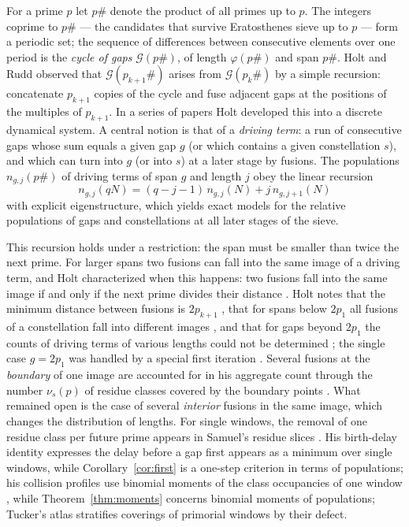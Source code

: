 \documentclass[11pt]{article}
\theoremstyle{definition}
\theoremstyle{remark}
\newcommand{\G}{\mathcal{G}}
\begin{document}
For a prime $p$ let $p\#$ denote the product of all primes up to $p$. The integers coprime to $p\#$ --- the candidates that survive Eratosthenes sieve up to $p$ --- form a periodic set; the sequence of differences between consecutive elements over one period is the \emph{cycle of gaps} $\G(p\#)$, of length $\varphi(p\#)$ and span $p\#$. Holt and Rudd \cite{HR15} observed that $\G(p_{k+1}\#)$ arises from $\G(p_k\#)$ by a simple recursion: concatenate $p_{k+1}$ copies of the cycle and fuse adjacent gaps at the positions of the multiples of $p_{k+1}$. In a series of papers \cite{HR15,Ho23,Ho25,Ho26} Holt developed this into a discrete dynamical system. A central notion is that of a \emph{driving term}: a run of consecutive gaps whose sum equals a given gap $g$ (or which contains a given constellation $s$), and which can turn into $g$ (or into $s$) at a later stage by fusions. The populations $n_{g,j}(p\#)$ of driving terms of span $g$ and length $j$ obey the linear recursion
\[
  n_{g,j}(qN) = (q-j-1)\, n_{g,j}(N) + j\, n_{g,j+1}(N)
\]
with explicit eigenstructure, which yields exact models for the relative populations of gaps and constellations at all later stages of the sieve.

This recursion holds under a restriction: the span must be smaller than twice the next prime. For larger spans two fusions can fall into the same image of a driving term, and Holt characterized when this happens: two fusions fall into the same image if and only if the next prime divides their distance \cite[Lemma~3.1]{Ho25}. Holt notes that the minimum distance between fusions is $2p_{k+1}$ \cite[Obs.~2.3]{Ho26}, that for spans below $2p_1$ all fusions of a constellation fall into different images \cite[Lemma~2.4]{Ho26}, and that for gaps beyond $2p_1$ the counts of driving terms of various lengths could not be determined \cite{HR15,Ho23}; the single case $g = 2p_1$ was handled by a special first iteration \cite{Ho23}. Several fusions at the \emph{boundary} of one image are accounted for in his aggregate count through the number $\nu_s(p)$ of residue classes covered by the boundary points \cite[Lemma~2.5, Lemma~2.7]{Ho26}. What remained open is the case of several \emph{interior} fusions in the same image, which changes the distribution of lengths. For single windows, the removal of one residue class per future prime appears in Samuel's residue slices \cite{Sa26}. His birth-delay identity \cite[Thm.~4.2]{Sa26} expresses the delay before a gap first appears as a minimum over single windows, while Corollary~\ref{cor:first} is a one-step criterion in terms of populations; his collision profiles use binomial moments of the class occupancies of one window \cite[Prop.~5.1]{Sa26}, while Theorem~\ref{thm:moments} concerns binomial moments of populations; Tucker's atlas \cite{Tu26} stratifies coverings of primorial windows by their defect.
\end{document}
